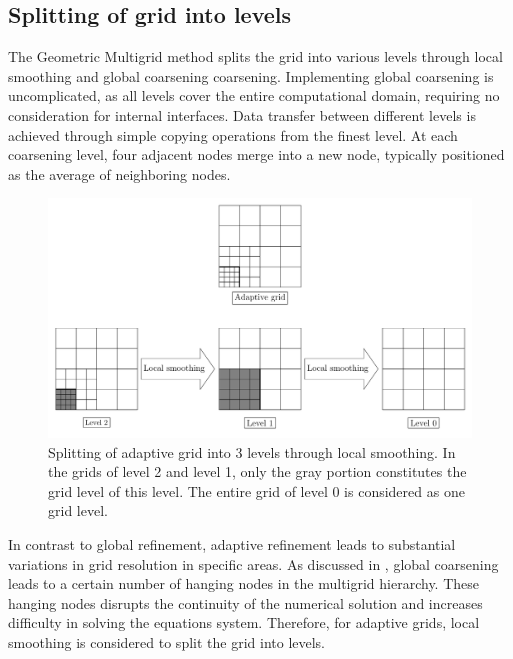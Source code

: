 \documentclass[extra, referee]{gji}
\begin{document}
\subsection{ Splitting of grid into levels}
The Geometric Multigrid method splits the grid into various levels through local
smoothing and global coarsening coarsening. Implementing global coarsening is
uncomplicated, as all levels cover the entire computational domain, requiring no
consideration for internal interfaces. Data transfer between different levels is
achieved through simple copying operations from the finest level. At each
coarsening level, four adjacent nodes merge into a new node, typically
positioned as the average of neighboring nodes.
\begin{figure}
  \centering
  \includegraphics[width=1 \textwidth]{fig/local_smoothing.pdf}
  \caption{Splitting of adaptive grid into 3 levels through local smoothing. In
    the grids of level 2 and level 1, only the gray portion constitutes the grid
    level of this level. The entire grid of level 0 is considered as one grid
    level.}
  \label{fig:local_smoothing}
\end{figure}

In contrast to global refinement, adaptive refinement leads to substantial
variations in grid resolution in specific areas. As discussed in
\citep{Munch2023}, global coarsening leads to a certain number of hanging nodes
in the multigrid hierarchy. These hanging nodes disrupts the continuity of the
numerical solution and increases difficulty in solving the equations system.
Therefore, for adaptive grids, local smoothing is considered to split the grid
into levels.
\end{document}
